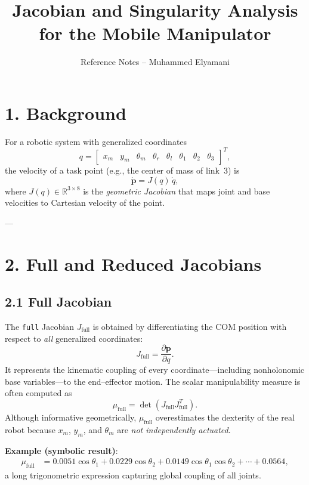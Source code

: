 \documentclass[12pt,a4paper]{article}
\begin{document}
\title{\textbf{Jacobian and Singularity Analysis for the Mobile Manipulator}}
\author{Reference Notes -- Muhammed Elyamani}
\date{}
\maketitle

\section*{1. Background}

For a robotic system with generalized coordinates
\[
q =
\begin{bmatrix}
x_m & y_m & \theta_m & \theta_r & \theta_l &
\theta_1 & \theta_2 & \theta_3
\end{bmatrix}^{T},
\]
the velocity of a task point (e.g., the center of mass of link~3) is
\[
\dot{\bm{p}} = J(q)\,\dot{q},
\]
where \(J(q)\in\mathbb{R}^{3\times 8}\) is the \emph{geometric Jacobian} that maps joint and base velocities to Cartesian velocity of the point.

---

\section*{2. Full and Reduced Jacobians}

\subsection*{2.1 Full Jacobian}
The \texttt{full} Jacobian $J_{\text{full}}$ is obtained by differentiating the COM position with respect to \emph{all} generalized coordinates:
\[
J_{\text{full}} = \frac{\partial \bm{p}}{\partial q}.
\]
It represents the kinematic coupling of every coordinate---including nonholonomic base variables---to the end--effector motion.
The scalar manipulability measure is often computed as
\[
\mu_{\text{full}} = \det(J_{\text{full}}J_{\text{full}}^{T}).
\]
Although informative geometrically, $\mu_{\text{full}}$ overestimates the dexterity of the real robot because
$x_m$, $y_m$, and $\theta_m$ are \emph{not independently actuated}.

\vspace{1em}
\textbf{Example (symbolic result)}:
\begin{align*}
\mu_{\text{full}}
&= 0.0051\cos\theta_1 + 0.0229\cos\theta_2
   + 0.0149\cos\theta_1\cos\theta_2
   + \cdots + 0.0564,
\end{align*}
a long trigonometric expression capturing global coupling of all joints.
\end{document}
